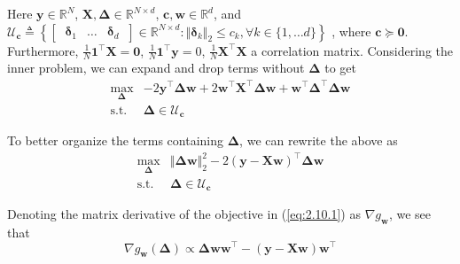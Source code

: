 \documentclass{article}
\numberwithin{equation}{section}
\begin{document}
Here $ \mathbf{y} \in \mathbb{R}^N $, $ \mathbf{X}, \boldsymbol{\Delta} \in
\mathbb{R}^{N \times d} $, $ \mathbf{c}, \mathbf{w} \in \mathbb{R}^d $, and
$
    \mathcal{U}_\mathbf{c} \triangleq \left\{
        \begin{bmatrix}
             \ \boldsymbol{\delta}_1 & \ldots & \boldsymbol{\delta}_d \
        \end{bmatrix} \in
        \mathbb{R}^{N \times d} : \Vert\boldsymbol{\delta}_k\Vert_2 \le c_k,
        \forall k \in \{1, \ldots d\}
    \right\}
$%
, where $ \mathbf{c} \succeq \mathbf{0} $. Furthermore,
$ \frac{1}{N}\mathbf{1}^\top\mathbf{X} = \mathbf{0} $,
$ \frac{1}{N}\mathbf{1}^\top\mathbf{y} = 0 $,
$ \frac{1}{N}\mathbf{X}^\top\mathbf{X} $ a correlation matrix. Considering
the inner problem, we can expand and drop terms without
$ \boldsymbol{\Delta} $ to get
\begin{equation*}
    \begin{array}{rl}
        \displaystyle\max_{\boldsymbol{\Delta}} &
        -2\mathbf{y}^\top\boldsymbol{\Delta}\mathbf{w} +
        2\mathbf{w}^\top\mathbf{X}^\top\boldsymbol{\Delta}\mathbf{w} +
        \mathbf{w}^\top\boldsymbol{\Delta}^\top\boldsymbol{\Delta}\mathbf{w} \\
        \text{s.t.} & \boldsymbol{\Delta} \in \mathcal{U}_\mathbf{c}
    \end{array}
\end{equation*}

To better organize the terms containing $ \boldsymbol{\Delta} $, we can
rewrite the above as
\begin{equation} \label{eq:2.10.1}
    \begin{array}{rl}
        \displaystyle\max_{\boldsymbol{\Delta}} &
        \Vert\boldsymbol{\Delta}\mathbf{w}\Vert_2^2 -
        2(\mathbf{y} - \mathbf{Xw})^\top\boldsymbol{\Delta}\mathbf{w} \\
        \text{s.t.} & \boldsymbol{\Delta} \in \mathcal{U}_\mathbf{c}
    \end{array}
\end{equation}

Denoting the matrix derivative of the objective in (\ref{eq:2.10.1}) as
$ \nabla g_\mathbf{w} $, we see that
\begin{equation} \label{eq:2.10.2}
    \nabla g_\mathbf{w}(\boldsymbol{\Delta}) \propto
    \boldsymbol{\Delta}\mathbf{ww}^\top -
    (\mathbf{y} - \mathbf{Xw})\mathbf{w}^\top
\end{equation}
\end{document}
